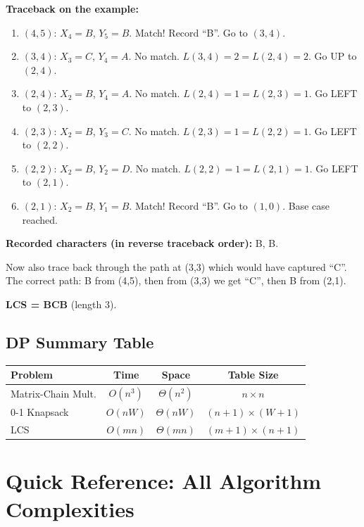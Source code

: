 \documentclass[12pt,portrait]{article}
\begin{document}
\textbf{Traceback on the example:}
\begin{enumerate}[leftmargin=*]
    \item $(4,5)$: $X_4=B$, $Y_5=B$. Match! Record ``B''. Go to $(3,4)$.
    \item $(3,4)$: $X_3=C$, $Y_4=A$. No match. $L(3,4)=2 = L(2,4)=2$. Go UP to $(2,4)$.
    \item $(2,4)$: $X_2=B$, $Y_4=A$. No match. $L(2,4)=1 = L(2,3)=1$. Go LEFT to $(2,3)$.
    \item $(2,3)$: $X_2=B$, $Y_3=C$. No match. $L(2,3)=1 = L(2,2)=1$. Go LEFT to $(2,2)$.
    \item $(2,2)$: $X_2=B$, $Y_2=D$. No match. $L(2,2)=1 = L(2,1)=1$. Go LEFT to $(2,1)$.
    \item $(2,1)$: $X_2=B$, $Y_1=B$. Match! Record ``B''. Go to $(1,0)$. Base case reached.
\end{enumerate}

\textbf{Recorded characters (in reverse traceback order):} B, B.

Now also trace back through the path at (3,3) which would have captured ``C''. The correct path: B from (4,5), then from (3,3) we get ``C'', then B from (2,1).

\textbf{LCS = BCB} (length 3).

\subsection{DP Summary Table}

\begin{center}
\begin{tabular}{l|c|c|c}
\toprule
\textbf{Problem} & \textbf{Time} & \textbf{Space} & \textbf{Table Size} \\
\midrule
Matrix-Chain Mult. & $O(n^3)$ & $\Theta(n^2)$ & $n \times n$ \\
0-1 Knapsack & $O(nW)$ & $\Theta(nW)$ & $(n+1) \times (W+1)$ \\
LCS & $O(mn)$ & $\Theta(mn)$ & $(m+1) \times (n+1)$ \\
\bottomrule
\end{tabular}
\end{center}

\section{Quick Reference: All Algorithm Complexities}
\end{document}
